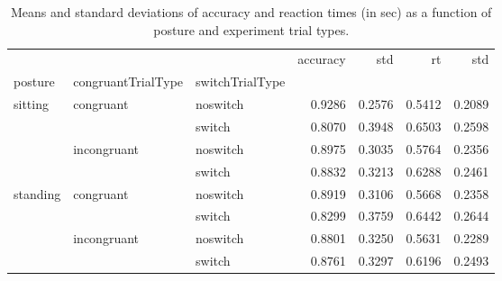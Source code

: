 \begin{table}
\centering
\caption{Means and standard deviations of accuracy and reaction times (in sec) as a function of posture and experiment trial types.}
\label{table-task-switching-replication-reaction-time}
\begin{tabular}{lllrrrr}
\toprule
         &             &        & accuracy &    std &     rt &    std \\
posture & congruantTrialType & switchTrialType &          &        &        &        \\
\midrule
sitting & congruant & noswitch &   0.9286 & 0.2576 & 0.5412 & 0.2089 \\
         &             & switch &   0.8070 & 0.3948 & 0.6503 & 0.2598 \\
         & incongruant & noswitch &   0.8975 & 0.3035 & 0.5764 & 0.2356 \\
         &             & switch &   0.8832 & 0.3213 & 0.6288 & 0.2461 \\
standing & congruant & noswitch &   0.8919 & 0.3106 & 0.5668 & 0.2358 \\
         &             & switch &   0.8299 & 0.3759 & 0.6442 & 0.2644 \\
         & incongruant & noswitch &   0.8801 & 0.3250 & 0.5631 & 0.2289 \\
         &             & switch &   0.8761 & 0.3297 & 0.6196 & 0.2493 \\
\bottomrule
\end{tabular}
\end{table}
